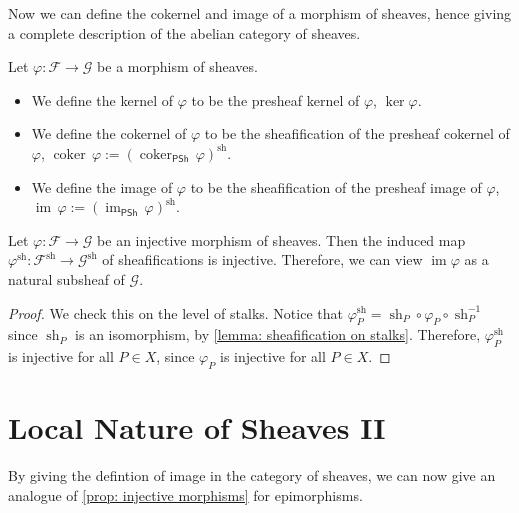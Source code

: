\documentclass[11pt]{article}
\newcommand{\im}{\operatorname{im}}
\newcommand{\PSh}{\mathsf{PSh}}
\newcommand{\sh}{\operatorname{sh}}
\begin{document}
Now we can define the cokernel and image of a morphism of sheaves, 
hence giving a complete description of the abelian category of sheaves. 

\begin{definition}
    Let $\varphi: \mathscr{F} \to \mathscr{G}$ be a morphism of sheaves. 
    \begin{itemize}
        \item We define the kernel of $\varphi$ to be the presheaf kernel of $\varphi$, 
        $ \ker \varphi $. 
        \item We define the cokernel of $\varphi$ to be the sheafification of the presheaf cokernel of $\varphi$, 
    $\operatorname{coker}\,\varphi := (\operatorname{coker}_{\PSh}\,\varphi)^{\sh}.$
        \item We define the image of $\varphi$ to be the sheafification of the presheaf image of $\varphi$, 
    $\operatorname{im}\,\varphi := (\operatorname{im}_{\PSh}\,\varphi)^{\sh}.$ 
    \end{itemize}
\end{definition}

\begin{corollary}
    \cite[Ex 1.4]{hartsAG}
    Let $\varphi: \mathscr{F} \to \mathscr{G}$ be an injective morphism of sheaves. 
    Then the induced map $\varphi^{\sh} : \mathscr{F}^{\sh}\to \mathscr{G}^{\sh}$ 
    of sheafifications is injective. 
    Therefore, we can view $\im \varphi$ as a natural subsheaf 
    of $\mathscr{G}$. 
\end{corollary}

\begin{proof}
    We check this on the level of stalks. 
    Notice that $ \varphi^{\sh}_{P} = \sh_{P} \circ \varphi_{P} \circ \sh_{P}^{-1} $ 
    since $ \sh_{P} $ is an isomorphism, by \ref{lemma: sheafification on stalks}. 
    Therefore, $ \varphi^{\sh}_{P} $ is injective for all $ P \in X $, 
    since $ \varphi_{P} $ is injective for all $ P \in X $. 
\end{proof}

\section{Local Nature of Sheaves II}

By giving the defintion of image in the category of sheaves, 
we can now give an analogue of \autoref{prop: injective morphisms} for epimorphisms. 
\end{document}
